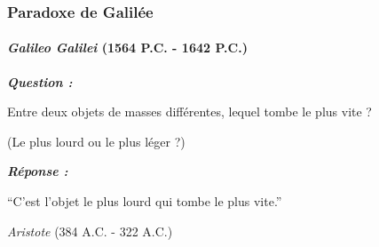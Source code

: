 \documentclass[usenames, dvipsnames, no-framenumber]{beamer}
\begin{document}
\begin{frame}%
\frametitle{Paradoxe de Galilée}
\framesubtitle{\textit{Galileo Galilei} (1564 P.C. - 1642 P.C.)}

\textit{\textbf{Question :}}

Entre deux objets de masses différentes, lequel tombe le plus vite ?

(Le plus lourd ou le plus léger ?)

\vspace{1cm}
\textit{\textbf{Réponse :}}

``C'est l'objet le plus lourd qui tombe le plus vite.''

\textit{Aristote} (384 A.C. - 322 A.C.)


\end{frame}
\end{document}
